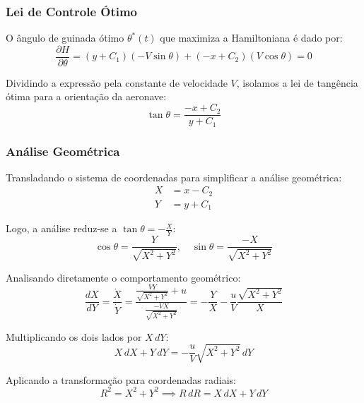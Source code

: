 \documentclass[a4paper, 12pt]{article}%
\begin{document}
\subsubsection*{Lei de Controle Ótimo}
O ângulo de guinada ótimo $\theta^*(t)$ que maximiza a Hamiltoniana é dado por:
\begin{equation}
    \frac{\partial H}{\partial \theta} = (y + C_1)(-V \sin\theta) + (-x + C_2)(V \cos\theta) = 0
\end{equation}

Dividindo a expressão pela constante de velocidade $V$, isolamos a lei de tangência ótima para a orientação da aeronave:
\begin{equation}
    \tan\theta = \frac{-x + C_2}{y + C_1}
\end{equation}

\subsubsection*{Análise Geométrica}
Transladando o sistema de coordenadas para simplificar a análise geométrica:
\begin{align}
    X &= x - C_2 \\
    Y &= y + C_1
\end{align}

Logo, a análise reduz-se a $\tan\theta = -\frac{X}{Y}$:
\begin{equation}
    \cos\theta = \frac{Y}{\sqrt{X^2 + Y^2}}, \quad \sin\theta = \frac{-X}{\sqrt{X^2 + Y^2}}
\end{equation}

Analisando diretamente o comportamento geométrico:
\begin{equation}
    \frac{dX}{dY} = \frac{\dot{X}}{\dot{Y}} = \frac{\frac{V Y}{\sqrt{X^2 + Y^2}} + u}{\frac{-V X}{\sqrt{X^2 + Y^2}}} = -\frac{Y}{X} - \frac{u}{V}\frac{\sqrt{X^2 + Y^2}}{X}
\end{equation}

Multiplicando os dois lados por $X \, dY$:
\begin{equation}
    X \, dX + Y \, dY = -\frac{u}{V}\sqrt{X^2 + Y^2} \, dY
\end{equation}

Aplicando a transformação para coordenadas radiais:
\begin{equation}
    R^2 = X^2 + Y^2 \implies R \, dR = X \, dX + Y \, dY
\end{equation}
\end{document}
